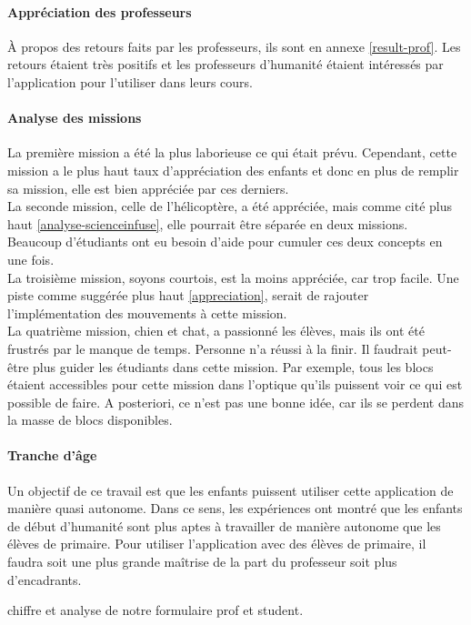 \paragraph{Appréciation des professeurs}
À propos des retours faits par les professeurs, ils sont en annexe \ref{result-prof}. Les retours étaient très positifs et les professeurs d'humanité étaient intéressés par l'application pour l'utiliser dans leurs cours.

\paragraph{Analyse des missions}
La première mission a été la plus laborieuse ce qui était prévu. Cependant, cette mission a le plus haut taux d'appréciation des enfants et donc en plus de remplir sa mission, elle est bien appréciée par ces derniers.\\

La seconde mission, celle de l'hélicoptère, a été appréciée, mais comme cité plus haut \ref{analyse-scienceinfuse}, elle pourrait être séparée en deux missions. Beaucoup d'étudiants ont eu besoin d'aide pour cumuler ces deux concepts en une fois.\\

La troisième mission, soyons courtois, est la moins appréciée, car trop facile. Une piste comme suggérée plus haut \ref{appreciation}, serait de rajouter l'implémentation des mouvements à cette mission.\\

La quatrième mission, chien et chat, a passionné les élèves, mais ils ont été frustrés par le manque de temps. Personne n'a réussi à la finir. Il faudrait peut-être plus guider les étudiants dans cette mission. Par exemple, tous les blocs étaient accessibles pour cette mission dans l'optique qu'ils puissent voir ce qui est possible de faire. A posteriori, ce n'est pas une bonne idée, car ils se perdent dans la masse de blocs disponibles.

\paragraph{Tranche d'âge}
\label{trancheage}
Un objectif de ce travail est que les enfants puissent utiliser cette application de manière quasi autonome. Dans ce sens, les expériences ont montré que les enfants de début d'humanité sont plus aptes à travailler de manière autonome que les élèves de primaire.
Pour utiliser l'application avec des élèves de primaire, il faudra soit une plus grande maîtrise de la part du professeur soit plus d'encadrants.






chiffre et analyse de notre formulaire prof et student.
